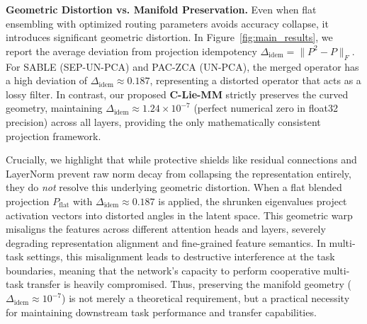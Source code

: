 \textbf{Geometric Distortion vs. Manifold Preservation.}
Even when flat ensembling with optimized routing parameters avoids accuracy collapse, it introduces significant geometric distortion. In Figure~\ref{fig:main_results}, we report the average deviation from projection idempotency $\Delta_{\text{idem}} = \|P^2 - P\|_F$. For SABLE (SEP-UN-PCA) and PAC-ZCA (UN-PCA), the merged operator has a high deviation of $\Delta_{\text{idem}} \approx 0.187$, representing a distorted operator that acts as a lossy filter. In contrast, our proposed \textbf{C-Lie-MM} strictly preserves the curved geometry, maintaining $\Delta_{\text{idem}} \approx 1.24 \times 10^{-7}$ (perfect numerical zero in float32 precision) across all layers, providing the only mathematically consistent projection framework.

Crucially, we highlight that while protective shields like residual connections and LayerNorm prevent raw norm decay from collapsing the representation entirely, they do \emph{not} resolve this underlying geometric distortion. When a flat blended projection $P_{\text{flat}}$ with $\Delta_{\text{idem}} \approx 0.187$ is applied, the shrunken eigenvalues project activation vectors into distorted angles in the latent space. This geometric warp misaligns the features across different attention heads and layers, severely degrading representation alignment and fine-grained feature semantics. In multi-task settings, this misalignment leads to destructive interference at the task boundaries, meaning that the network's capacity to perform cooperative multi-task transfer is heavily compromised. Thus, preserving the manifold geometry ($\Delta_{\text{idem}} \approx 10^{-7}$) is not merely a theoretical requirement, but a practical necessity for maintaining downstream task performance and transfer capabilities.

